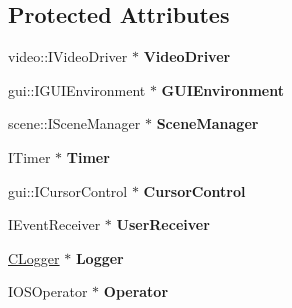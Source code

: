 \subsection*{Protected Attributes}
\begin{DoxyCompactItemize}
\item 
\hypertarget{classirr_1_1_c_irr_device_stub_a008a69aea0b7f1bd431e1f2d3e38a35b}{video\-::\-I\-Video\-Driver $\ast$ {\bfseries Video\-Driver}}\label{classirr_1_1_c_irr_device_stub_a008a69aea0b7f1bd431e1f2d3e38a35b}

\item 
\hypertarget{classirr_1_1_c_irr_device_stub_aade55f96a436063edf8aa0b5218003cc}{gui\-::\-I\-G\-U\-I\-Environment $\ast$ {\bfseries G\-U\-I\-Environment}}\label{classirr_1_1_c_irr_device_stub_aade55f96a436063edf8aa0b5218003cc}

\item 
\hypertarget{classirr_1_1_c_irr_device_stub_a1e5b01a9cdd051e3d39e1238ececc5d3}{scene\-::\-I\-Scene\-Manager $\ast$ {\bfseries Scene\-Manager}}\label{classirr_1_1_c_irr_device_stub_a1e5b01a9cdd051e3d39e1238ececc5d3}

\item 
\hypertarget{classirr_1_1_c_irr_device_stub_adb63d288c8028f0319e8bc3e07850be2}{I\-Timer $\ast$ {\bfseries Timer}}\label{classirr_1_1_c_irr_device_stub_adb63d288c8028f0319e8bc3e07850be2}

\item 
\hypertarget{classirr_1_1_c_irr_device_stub_a890cd5d7dace8c08dd25e133e0207959}{gui\-::\-I\-Cursor\-Control $\ast$ {\bfseries Cursor\-Control}}\label{classirr_1_1_c_irr_device_stub_a890cd5d7dace8c08dd25e133e0207959}

\item 
\hypertarget{classirr_1_1_c_irr_device_stub_a9eecedaabd4eb994dd3a35302045699c}{I\-Event\-Receiver $\ast$ {\bfseries User\-Receiver}}\label{classirr_1_1_c_irr_device_stub_a9eecedaabd4eb994dd3a35302045699c}

\item 
\hypertarget{classirr_1_1_c_irr_device_stub_ab1f84aea9b20eaf43e3ac6ceb0870a73}{\hyperlink{classirr_1_1_c_logger}{C\-Logger} $\ast$ {\bfseries Logger}}\label{classirr_1_1_c_irr_device_stub_ab1f84aea9b20eaf43e3ac6ceb0870a73}

\item 
\hypertarget{classirr_1_1_c_irr_device_stub_afa23c1aadadca44cbfb9a1cada4dfb4b}{I\-O\-S\-Operator $\ast$ {\bfseries Operator}}\label{classirr_1_1_c_irr_device_stub_afa23c1aadadca44cbfb9a1cada4dfb4b}


\end{DoxyCompactItemize}
